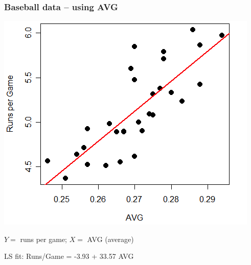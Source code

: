 \documentclass{beamer}
\begin{document}
\begin{frame}
\frametitle{Baseball data -- using AVG} 

\vspace{-5.8mm}
\begin{center}
\includegraphics[scale=0.42]{figures/AvgR.png}	
\end{center}

\vspace{-5.8mm}
$Y=$ runs per game; $X=$ AVG (average)

\vspace{1mm}
LS fit: {\color{red} Runs/Game = -3.93 + 33.57 AVG}
\end{frame}
\end{document}
